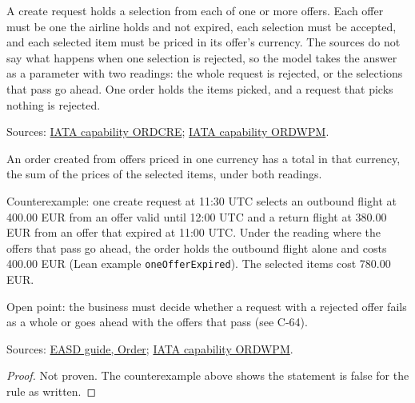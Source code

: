 \begin{definition}
  \label{def:order-creation-create-order}
  A create request holds a selection from each of one or more offers.  Each
  offer must be one the airline holds and not expired, each selection must be
  accepted, and each selected item must be priced in its offer's currency.
  The sources do not say what happens when one selection is rejected, so the
  model takes the answer as a parameter with two readings: the whole request
  is rejected, or the selections that pass go ahead.  One order holds the
  items picked, and a request that picks nothing is rejected.

  Sources: \href{https://retailing.iata.org/armi/docs/ORDCRE/}{IATA capability ORDCRE};
  \href{https://retailing.iata.org/armi/docs/ORDWPM/}{IATA capability ORDWPM}.
\end{definition}

\begin{theorem}
  \label{thm:order-creation-price-sum}
  An order created from offers priced in one currency has a total in that
  currency, the sum of the prices of the selected items, under both readings.

  Counterexample: one create request at 11:30 UTC selects an outbound flight
  at 400.00 EUR from an offer valid until 12:00 UTC and a return flight at
  380.00 EUR from an offer that expired at 11:00 UTC.  Under the reading where
  the offers that pass go ahead, the order holds the outbound flight alone
  and costs 400.00 EUR (Lean example \texttt{oneOfferExpired}).
  The selected items cost 780.00 EUR.

  Open point: the business must decide whether a request with a rejected
  offer fails as a whole or goes ahead with the offers that pass (see C-64).

  Sources: \href{https://standards.atlassian.net/wiki/spaces/EASD/pages/574849062/Order}{EASD guide, Order};
  \href{https://retailing.iata.org/armi/docs/ORDWPM/}{IATA capability ORDWPM}.
\end{theorem}
\begin{proof}
  Not proven.  The counterexample above shows the statement is false for the
  rule as written.
\end{proof}

